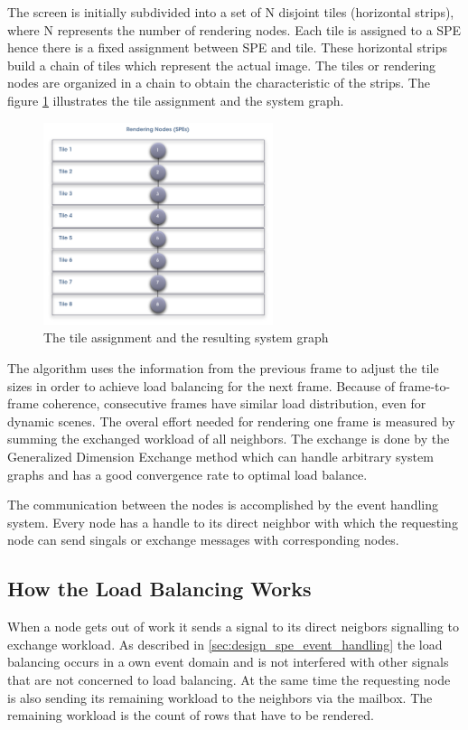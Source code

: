 \documentclass[DIV10, abstracton, openright, footsepline, headsepline, twoside, 9pt,
bigheadings]{scrreprt}
\begin{document}
The screen is initially subdivided into a set of N disjoint tiles (horizontal strips),
where N represents the  number of rendering nodes. Each tile is assigned to a SPE hence
there is a fixed assignment between SPE and tile. These horizontal strips build a chain
of tiles which represent the actual image. The tiles or rendering nodes are organized in a chain to obtain the characteristic of the strips. The figure
\ref{fig:tile_assignment} illustrates the tile assignment and the system graph.

\begin{figure}[H]
\centering
\includegraphics[width=0.6\textwidth]{diagramme/tile_assignment}
\caption{The tile assignment and the resulting system graph}
\label{fig:tile_assignment}
\end{figure}

The algorithm uses the information from the previous frame to adjust the tile sizes in order
to achieve load balancing  for the next frame. Because of frame-to-frame coherence, consecutive
frames have similar load distribution, even for dynamic scenes. The overal effort needed for
rendering one frame is measured by summing the exchanged  workload of all neighbors. The exchange is done by the Generalized Dimension Exchange method which can handle arbitrary system graphs and has a good convergence rate to optimal load balance.

The communication between the nodes is accomplished by the event handling system. Every node
has a handle to its direct neighbor with which the requesting node can send singals or exchange
messages with corresponding nodes.

\subsection{How the Load Balancing Works}
\label{sec:design_how_load_balancing}
When a node gets out of work it sends a signal to its direct neigbors signalling to exchange
workload. As described in \ref{sec:design_spe_event_handling} the load balancing occurs in a
own event domain and is not interfered with other signals that are not concerned to load
balancing. At the same time the requesting node is also sending its remaining workload
to the neighbors via the mailbox. The remaining workload is the count of rows that have to
be rendered.
\end{document}
